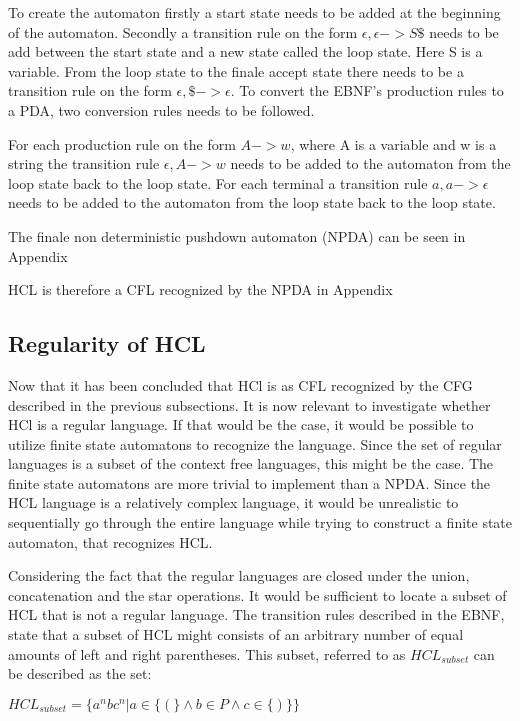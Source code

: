 To create the automaton firstly a start state needs to be added at the beginning of the automaton. Secondly a transition rule on the form $\epsilon,\epsilon->S\$$ needs to be add between the start state and a new state called the loop state.
Here S is a variable.
From the loop state to the finale accept state there needs to be a transition rule on the form $\epsilon,\$->\epsilon$.
To convert the EBNF's production rules to a PDA, two conversion rules needs to be followed.

For each production rule on the form $A->w$, where A is a variable and w is a string the transition rule $\epsilon,A->w$ needs to be added to the automaton from the loop state back to the loop state.
For each terminal a transition rule $a,a->\epsilon$ needs to be added to the automaton from the loop state back to the loop state.

The finale non deterministic pushdown automaton (NPDA) can be seen in Appendix %

HCL is therefore a CFL recognized by the NPDA in Appendix %

\subsection{Regularity of HCL}
Now that it has been concluded that HCl is as CFL recognized by the CFG described in the previous subsections.
It is now relevant to investigate whether HCl is a regular language. If that would be the case, it would be possible to utilize finite state automatons to recognize the language.
Since the set of regular languages is a subset of the context free languages, this might be the case.
The finite state automatons are more trivial to implement than a NPDA. 
Since the HCL language is a relatively complex language, it would be unrealistic to sequentially go through the entire language while trying to construct a finite state automaton, that recognizes HCL.

Considering the fact that the regular languages are closed under the union, concatenation and the star operations. 
It would be sufficient to locate a subset of HCL that is not a regular language.
The transition rules described in the EBNF, state that a subset of HCL might consists of an arbitrary number of equal amounts of left and right parentheses.
This subset, referred to as $HCL_{subset}$ can be described as the set:
\begin{center}
	$HCL_{subset} = \{a^nbc^n | a \in \{(\} \wedge b \in P \wedge c \in \{)\}\}$
\end{center}

